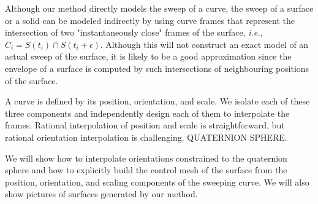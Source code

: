 Although our method directly models the sweep of a curve,
the sweep of a surface or a solid can be modeled indirectly
by using curve frames that represent the intersection of two 
"instantaneously close" frames of the surface,
{\em i.e.}, $C_i = S(t_i) \cap S(t_i+\epsilon)$.
Although this will not construct an 
exact model of an actual sweep of the surface,
it is likely to be a good approximation since the 
envelope of a surface is computed by such intersections
of neighbouring positions of the surface.

A curve is defined by its position, orientation, and scale.
We isolate each of these three components and independently 
design each of them to interpolate the frames.
Rational interpolation of position and scale is straightforward, 
but rational orientation interpolation is challenging.
QUATERNION SPHERE.

\vspace{1in}

We will show how to interpolate orientations constrained to the quaternion sphere
and how to explicitly build the control mesh of the surface from the position,
orientation, and scaling components of the sweeping curve.
We will also show pictures of surfaces generated by our method.

